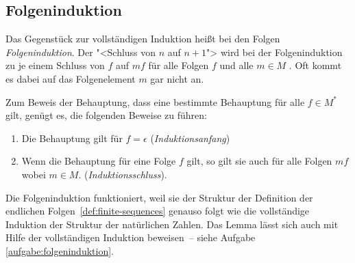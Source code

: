 \subsection{Folgeninduktion}
\label{sec:sequence-induction}
Das Gegenstück zur vollständigen Induktion heißt bei den Folgen
\textit{Folgeninduktion}.  Der "<Schluss von $n$ auf $n+1$"> wird bei
der Folgeninduktion zu je einem Schluss von $f$ auf $mf$ für alle
Folgen $f$ und alle $m\in M$ . Oft kommt es dabei auf das Folgenelement $m$ gar
nicht an.

Zum
Beweis der Behauptung, dass eine bestimmte Behauptung für alle
$f\in M^\ast$ gilt, genügt es, die folgenden Beweise zu führen:
\begin{enumerate} 
\item Die Behauptung gilt für $f=\epsilon$ (\textit{Induktionsanfang})
\item Wenn die Behauptung für eine Folge $f$ gilt, so gilt sie auch
  für alle Folgen $mf$ wobei $m\in{M}$.
  (\textit{Induktionsschluss}).
\end{enumerate}
% 
Die Folgeninduktion funktioniert, weil sie der Struktur der Definition
der endlichen Folgen~\ref{def:finite-sequences} genauso folgt wie die
vollständige Induktion der Struktur der natürlichen Zahlen.  Das Lemma
lässt sich auch mit Hilfe der vollständigen Induktion beweisen~-- siehe
Aufgabe \ref{aufgabe:folgeninduktion}.

